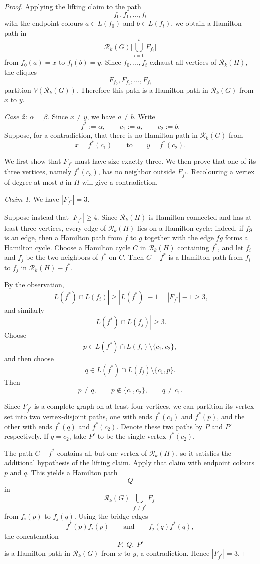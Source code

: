\documentclass[11pt]{article}
\theoremstyle{remark}
\newcommand{\Rk}{\mathcal R_k}
\numberwithin{equation}{section}
\begin{document}
\begin{proof}
Applying the lifting claim to the path
\[
f_0,f_1,\dots,f_t
\]
with the endpoint colours $a\in L(f_0)$ and $b\in L(f_t)$, we obtain a Hamilton path in
\[
\Rk(G)\bigg[\bigcup_{i=0}^{t}F_{f_i}\bigg]
\]
from $f_0(a)=x$ to $f_t(b)=y$. Since $f_0,\dots,f_t$ exhaust all vertices of $\Rk(H)$, the cliques
\[
F_{f_0},F_{f_1},\dots,F_{f_t}
\]
partition $V(\Rk(G))$. Therefore this path is a Hamilton path in $\Rk(G)$ from $x$ to $y$.

\smallskip

\noindent\textit{Case 2: $\alpha=\beta$.}
Since $x\neq y$, we have $a\neq b$. Write
\[
f^\ast:=\alpha,\qquad c_1:=a,\qquad c_2:=b.
\]
Suppose, for a contradiction, that there is no Hamilton path in $\Rk(G)$ from
\[
x=f^\ast(c_1)\qquad \text{to}\qquad y=f^\ast(c_2).
\]

We first show that $F_{f^\ast}$ must have size exactly three. We then
prove that one of its three vertices, namely $f^\ast(c_3)$, has no
neighbor outside $F_{f^\ast}$. Recolouring a vertex of degree at most
$d$ in $H$ will give a contradiction.

\smallskip

\noindent\textit{Claim 1.} We have $|F_{f^\ast}|=3$.

Suppose instead that $|F_{f^\ast}|\geq 4$. Since $\Rk(H)$ is Hamilton-connected and has at least three vertices, every edge of $\Rk(H)$ lies on a Hamilton cycle: indeed, if $fg$ is an edge, then a Hamilton path from $f$ to $g$ together with the edge $fg$ forms a Hamilton cycle. Choose a Hamilton cycle $C$ in $\Rk(H)$ containing $f^\ast$, and let $f_i$ and $f_j$ be the two neighbors of $f^\ast$ on $C$. Then $C-f^\ast$ is a Hamilton path from $f_i$ to $f_j$ in $\Rk(H)-f^\ast$.

By the observation,
\[
|L(f^\ast)\cap L(f_i)|\geq |L(f^\ast)|-1=|F_{f^\ast}|-1\geq 3,
\]
and similarly
\[
|L(f^\ast)\cap L(f_j)|\geq 3.
\]
Choose
\[
p\in L(f^\ast)\cap L(f_i)\setminus\{c_1,c_2\},
\]
and then choose
\[
q\in L(f^\ast)\cap L(f_j)\setminus\{c_1,p\}.
\]
Then
\[
p\neq q,\qquad p\notin\{c_1,c_2\},\qquad q\neq c_1.
\]

Since $F_{f^\ast}$ is a complete graph on at least four vertices, we can partition its vertex set into two vertex-disjoint paths, one with ends $f^\ast(c_1)$ and $f^\ast(p)$, and the other with ends $f^\ast(q)$ and $f^\ast(c_2)$. Denote these two paths by $P$ and $P'$ respectively. If $q=c_2$, take $P'$ to be the single vertex $f^\ast(c_2)$.

The path $C-f^\ast$ contains all but one vertex of
$\Rk(H)$, so it satisfies the additional hypothesis of the
lifting claim. Apply that claim with endpoint colours $p$ and $q$.
This yields a Hamilton path
\[
Q
\]
in
\[
\Rk(G)\bigg[\bigcup_{f\neq f^\ast}F_f\bigg]
\]
from $f_i(p)$ to $f_j(q)$. Using the bridge edges
\[
f^\ast(p)f_i(p)\qquad\text{and}\qquad f_j(q)f^\ast(q),
\]
the concatenation
\[
P,\ Q,\ P'
\]
is a Hamilton path in $\Rk(G)$ from $x$ to $y$, a contradiction. Hence $|F_{f^\ast}|=3$.


\end{proof}
\end{document}
